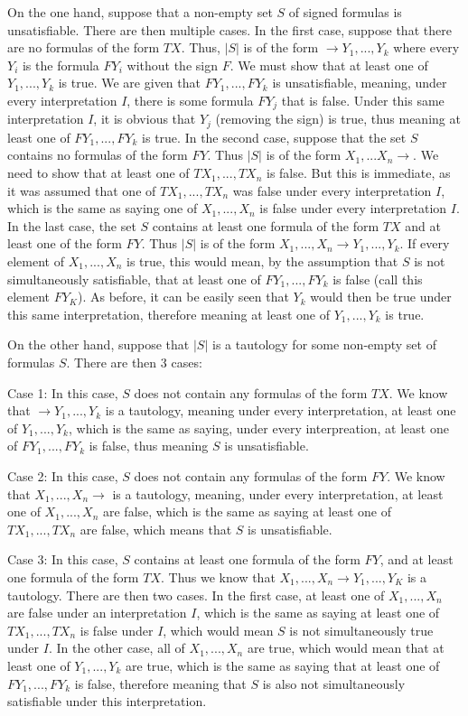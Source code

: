 \documentclass{article}
\theoremstyle{definition}
\begin{document}
On the one hand, suppose that a non-empty set $S$ of signed formulas is unsatisfiable. 
There are then multiple cases. In the first case, suppose that there are no formulas of the form 
$TX$. Thus, $|S|$ is of the form $\rightarrow Y_1,...,Y_k$ where every $Y_i$ is the formula $FY_i$ without the sign $F$. We must show that at least one of $Y_1,...,Y_k$ is true. 
We are given that $FY_1,...,FY_k$ is unsatisfiable, meaning, under every interpretation $I$, there is some formula $FY_j$ that is false. Under this same interpretation $I$, 
it is obvious that $Y_j$ (removing the sign) is true, thus meaning at least one of $FY_1,...,FY_k$ is true. In the second case, suppose that the set $S$ contains no formulas 
of the form $FY$. Thus $|S|$ is of the form $X_1,...X_n\rightarrow$. We need to show that at least one of $TX_1,...,TX_n$ is false. But this is immediate, as it was 
assumed that one of $TX_1,...,TX_n$ was false under every interpretation $I$, which is the same as saying one of $X_1,...,X_n$ is false under every interpretation $I$. 
In the last case, the set $S$ contains at least one formula of the form $TX$ and at least one of the form $FY$. Thus $|S|$ is of 
the form $X_1,...,X_n\rightarrow Y_1,...,Y_k$. If every element of $X_1,...,X_n$ is true, this would mean, by the assumption that $S$ is not simultaneously 
satisfiable, that at least one of $FY_1,...,FY_k$ is false (call this element $FY_K$). As before, it can be easily seen that $Y_k$ would then be true under this same 
interpretation, therefore meaning at least one of $Y_1,...,Y_k$ is true.


On the other hand, suppose that $|S|$ is a tautology for some non-empty set of formulas $S$. There are then 3 cases:


Case 1: In this case, $S$ does not contain any formulas of the form $TX$. We know that $\rightarrow Y_1,...,Y_k$ is a tautology, meaning under every interpretation, at least 
one of $Y_1,...,Y_k$, which is the same as saying, under every interpreation, at least one of $FY_1,...,FY_k$ is false, thus meaning $S$ is unsatisfiable.


Case 2: In this case, $S$ does not contain any formulas of the form $FY$. We know that $X_1,...,X_n\rightarrow $ is a tautology, meaning, under every interpretation, 
at least one of $X_1,...,X_n$ are false, which is the same as saying at least one of $TX_1,...,TX_n$ are false, which means that $S$ is unsatisfiable.


Case 3: In this case, $S$ contains at least one formula of the form $FY$, and at least one formula of the form $TX$. Thus we know that 
$X_1,...,X_n\rightarrow Y_1,...,Y_K$ is a tautology. There are then two cases. In the first case, at least one of $X_1,...,X_n$ are false under an interpretation $I$, 
which is the same as saying at least one of $TX_1,...,TX_n$ is false under $I$, which would mean $S$ is not simultaneously true under $I$. In the other case, 
all of $X_1,...,X_n$ are true, which would mean that at least one of $Y_1,...,Y_k$ are true, which is the same as saying that at least one of 
$FY_1,...,FY_k$ is false, therefore meaning that $S$ is also not simultaneously satisfiable under this interpretation.
\end{document}
